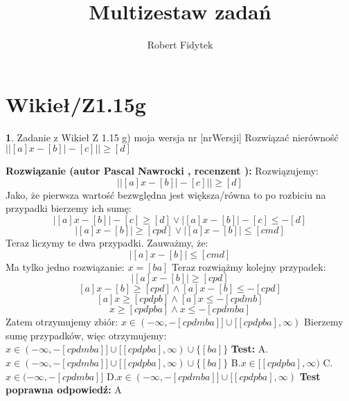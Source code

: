 \documentclass[12pt, a4paper]{article}
\title{Multizestaw zadań}
\author{Robert Fidytek}
\date{}
\theoremstyle{definition} %
\newtheorem{zad}{}
\newcommand{\kategoria}[1]{\section{#1}} %
\newcommand{\zadStart}[1]{\begin{zad}#1\newline} %
\newcommand{\zadStop}{\end{zad}}   %
\newcommand{\rozwStart}[2]{\noindent \textbf{Rozwiązanie (autor #1 , recenzent #2): }\newline} %
\newcommand{\odpStop}{\newline}                                             %
\newcommand{\testStart}{\noindent \textbf{Test:}\newline} %
\newcommand{\testStop}{\newline} %
\newcommand{\kluczStart}{\noindent \textbf{Test poprawna odpowiedź:}\newline} %
\newcommand{\kluczStop}{\newline} %
\begin{document}
\maketitle



\kategoria{Wikieł/Z1.15g}
\zadStart{Zadanie z Wikieł Z 1.15 g) moja wersja nr [nrWersji]}
Rozwiązać nierówność $\big||[a]x-[b]|-[c]|\big|\geq[d]$
\zadStop
\rozwStart{Pascal Nawrocki}{}
Rozwiązujemy:
$$\big||[a]x-[b]|-[c]|\big|\geq[d]$$
Jako, że pierwsza wartość bezwględna jest większa/równa to po rozbiciu na przypadki bierzemy ich sumę:
$$|[a]x-[b]|-[c]\geq[d] \vee |[a]x-[b]|-[c]\leq-[d]$$
$$|[a]x-[b]|\geq[cpd] \vee |[a]x-[b]|\leq[cmd]$$
Teraz liczymy te dwa przypadki. Zauważmy, że:
$$|[a]x-[b]|\leq[cmd]$$ Ma tylko jedno rozwiązanie: $x=[ba]$\newline
Teraz rozwiążmy kolejny przypadek:
$$|[a]x-[b]|\geq[cpd]$$
$$[a]x-[b]\geq[cpd]\wedge[a]x-[b]\leq-[cpd]$$
$$[a]x\geq[cpdpb]\wedge[a]x\leq-[cpdmb]$$
$$x\geq[cpdpba]\wedge x\leq-[cpdmba]$$
Zatem otrzymujemy zbiór: $x\in(-\infty,-[cpdmba]]\cup[[cpdpba],\infty)$
Bierzemy sumę przypadków, więc otrzymujemy:
$x\in(-\infty,-[cpdmba]]\cup[[cpdpba],\infty)\cup\{[ba]\}$
\odpStop
\testStart
A.$x\in(-\infty,-[cpdmba]]\cup[[cpdpba],\infty)\cup\{[ba]\}$
B.$x\in[[cpdpba],\infty)$
C.$x\in(-\infty,-[cpdmba]]$
D.$x\in(-\infty,-[cpdmba]]\cup[[cpdpba],\infty)$
\testStop
\kluczStart
A
\kluczStop
\end{document}
